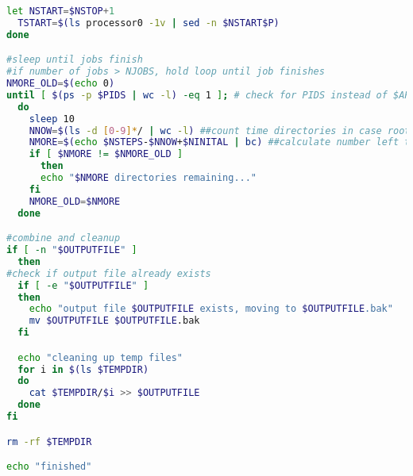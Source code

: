 \begin{lstlisting}[language=bash]
  let NSTART=$NSTOP+1
  TSTART=$(ls processor0 -1v | sed -n $NSTART$P)
done

#sleep until jobs finish
#if number of jobs > NJOBS, hold loop until job finishes
NMORE_OLD=$(echo 0)
until [ $(ps -p $PIDS | wc -l) -eq 1 ]; # check for PIDS instead of $APPNAME because other instances might also be running 
  do 
    sleep 10
    NNOW=$(ls -d [0-9]*/ | wc -l) ##count time directories in case root dir, this will include 0
    NMORE=$(echo $NSTEPS-$NNOW+$NINITAL | bc) ##calculate number left to reconstruct and subtract 0 dir
    if [ $NMORE != $NMORE_OLD ]
      then
      echo "$NMORE directories remaining..."
    fi
    NMORE_OLD=$NMORE
  done

#combine and cleanup
if [ -n "$OUTPUTFILE" ] 
  then
#check if output file already exists
  if [ -e "$OUTPUTFILE" ] 
  then
    echo "output file $OUTPUTFILE exists, moving to $OUTPUTFILE.bak"
    mv $OUTPUTFILE $OUTPUTFILE.bak
  fi

  echo "cleaning up temp files"
  for i in $(ls $TEMPDIR)
  do
    cat $TEMPDIR/$i >> $OUTPUTFILE
  done
fi

rm -rf $TEMPDIR

echo "finished"


\end{lstlisting}
